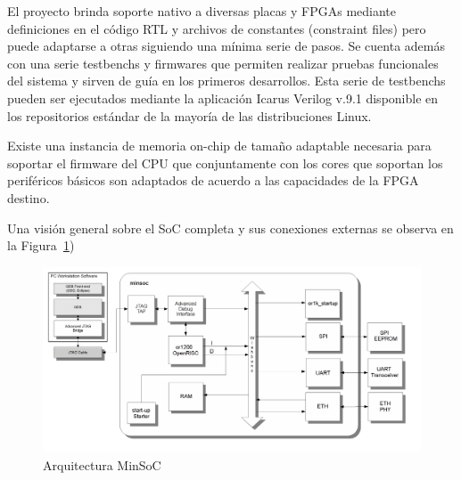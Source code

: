 El proyecto brinda soporte nativo a diversas placas y FPGAs mediante definiciones en el código RTL y archivos de constantes (constraint files)
				pero puede adaptarse a otras siguiendo una mínima serie de pasos. Se cuenta además con una serie testbenchs y firmwares que permiten realizar
				pruebas funcionales del sistema y sirven de guía en los primeros desarrollos. Esta serie de testbenchs pueden ser ejecutados mediante la
				aplicación Icarus Verilog v.9.1 disponible en los repositorios estándar de la mayoría de las distribuciones Linux. 
				
				Existe una instancia de memoria on-chip de tamaño adaptable necesaria para soportar el firmware del CPU que conjuntamente con los cores que
				soportan los periféricos básicos son adaptados de acuerdo a las capacidades de la FPGA destino. 

Una visión general sobre el SoC completa y sus conexiones externas se observa en la Figura~\ref{fig:esquemaminsoc})

\begin{figure}[h!]
 \begin{center}
  \includegraphics[width=1\textwidth,keepaspectratio=true]{./images/minsoc}
  \caption{Arquitectura MinSoC}
  \label{fig:esquemaminsoc}
 \end{center}
\end{figure}

